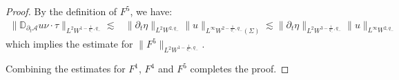 \documentclass[letterpaper,reqno,10pt,twoside]{amsart}
\theoremstyle{definition}
\theoremstyle{remark}
\def\p{\partial}
\begin{document}
\begin{proof}
		By the definition of $F^{5}$, we have:
		\[
		\begin{aligned}
			\| \mathbb{D}_{\p_{t}\mathcal{A}}u\nu\cdot \tau\|_{L^{2}W^{1-\frac{1}{q_{-}},q_{-}}}\lesssim& \|\p_{t}\eta\|_{L^{2}W^{2,q_{-}}}\|u\|_{L^{\infty}W^{2-\frac{1}{q_{-}},q_{-}}(\Sigma)}\lesssim \|\p_{t}\eta\|_{L^{2}W^{3-\frac{1}{q_{-}},q_{-}}}\|u\|_{L^{\infty}W^{2,q_{-}}}
		\end{aligned}
		\]
		\noindent which implies the estimate for $\|F^{5}\|_{L^{2}W^{1-\frac{1}{q_{-}},q_{-}}}$.
			
			Combining the estimates for $F^{1}$, $F^{4}$ and $F^{5}$ completes the proof.
		\end{proof}
		
\end{document}
